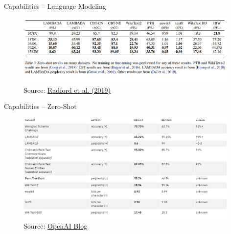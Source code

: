 
\begin{frame}{Capabilities -- Language Modeling}

\vfill

\begin{figure}
\centering
\includegraphics[width = 11cm]{figure/72-gpt2-lm-zeroshot.png}\\ 
\footnotesize{Source:} \href{https://cdn.openai.com/better-language-models/language_models_are_unsupervised_multitask_learners.pdf}{\footnotesize Radford et al. (2019)}
\end{figure}

\vfill

\end{frame}


\begin{frame}{Capabilities -- Zero-Shot}

\vfill

\begin{figure}
\centering
\includegraphics[width = 11cm]{figure/72-gpt2-zeroshot.png}\\ 
\footnotesize{Source:} \href{https://openai.com/blog/better-language-models/\#sample1}{\footnotesize OpenAI Blog}
\end{figure}

\vfill

\end{frame}

